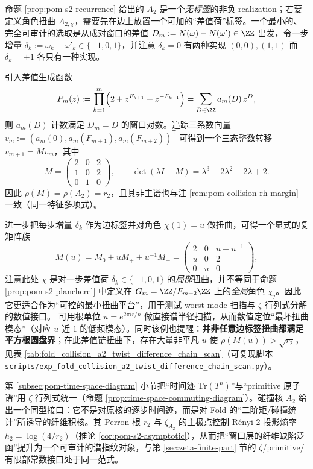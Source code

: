 \begin{remark}\label{rem:pom-a2-diffchain-twist}
命题 \ref{prop:pom-s2-recurrence} 给出的 \(A_2\) 是一个\emph{无标签}的非负 realization；若要定义角色扭曲 \(A_{2,\chi}\)，需要先在边上放置一个可加的“差值荷”标签。一个最小的、完全可审计的选取是从成对窗口的差值
\(
D_m:=N(\omega)-N(\omega')\in\ZZ
\)
出发，令一步增量 \(\delta_k:=\omega_k-\omega'_k\in\{-1,0,1\}\)，并注意 \(\delta_k=0\) 有两种实现 \((0,0),(1,1)\) 而 \(\delta_k=\pm 1\) 各只有一种实现。
\par
引入差值生成函数
\[
P_m(z):=\prod_{k=1}^m\Bigl(2+z^{F_{k+1}}+z^{-F_{k+1}}\Bigr)=\sum_{D\in\ZZ}a_m(D)\,z^D,
\]
则 \(a_m(D)\) 计数满足 \(D_m=D\) 的窗口对数。追踪三系数向量
\(
v_m:=(a_m(0),a_m(F_{m+1}),a_m(F_{m+2}))^{\mathsf T}
\)
可得到一个三态整数转移 \(v_{m+1}=Mv_m\)，其中
\[
M=
\begin{pmatrix}
2&0&2\\
1&0&2\\
0&1&0
\end{pmatrix},
\qquad
\det(\lambda I-M)=\lambda^3-2\lambda^2-2\lambda+2.
\]
因此 \(\rho(M)=\rho(A_2)=r_2\)，且其非主谱也与注 \ref{rem:pom-collision-rh-margin} 一致（同一特征多项式）。
\par
进一步把每步增量 \(\delta_k\) 作为边标签并对角色 \(\chi(1)=u\) 做扭曲，可得一个显式的复矩阵族
\[
M(u)=M_0+uM_++u^{-1}M_-=
\begin{pmatrix}
2&0&u+u^{-1}\\
u&0&2\\
0&u&0
\end{pmatrix},
\]
注意此处 \(\chi\) 是对一步差值荷 \(\delta_k\in\{-1,0,1\}\) 的\emph{局部}扭曲，并不等同于命题 \ref{prop:pom-s2-plancherel} 中定义在 \(G_m=\ZZ/F_{m+2}\ZZ\) 上的\emph{全局}角色 \(\chi_j\)。因此它更适合作为“可控的最小扭曲平台”，用于测试 worst-mode 扫描与 \(\zeta\) 行列式分解的数值接口。
可用根单位 \(u=e^{2\pi i r/n}\) 做直接谱半径扫描，从而数值定位“最坏扭曲模态”（对应 \(u\) 近 \(1\) 的低频模态）。同时该例也提醒：\textbf{并非任意边标签扭曲都满足平方根圆盘界}；在此差值链扭曲下，存在大量非平凡 \(u\) 使 \(\rho(M(u))>\sqrt{r_2}\)，见表 \ref{tab:fold_collision_a2_twist_difference_chain_scan}（可复现脚本 \texttt{scripts/exp\_fold\_collision\_a2\_twist\_difference\_chain\_scan.py}）。
\end{remark}



\begin{remark}\label{rem:pom-collision-diagram}
第 \ref{subsec:pom-time-space-diagram} 小节把“时间迹 \(\mathrm{Tr}(T^n)\)”与“primitive 原子谱”用 \(\zeta\) 行列式统一（命题 \ref{prop:time-space-commuting-diagram}）。碰撞核 \(A_2\) 给出一个同型接口：它不是对原核的逐步时间迹，而是对 Fold 的“二阶矩/碰撞统计”所诱导的纤维积核。其 Perron 根 \(r_2\) 与 \(\zeta_{A_2}\) 的主极点控制 Rényi-2 投影熵率 \(h_2=\log(4/r_2)\)（推论 \ref{cor:pom-s2-asymptotic}），从而把“窗口层的纤维缺陷泛函”提升为一个可审计的谱指纹对象，与第 \ref{sec:zeta-finite-part} 节的 \(\zeta\)/primitive/有限部常数接口处于同一范式。
\end{remark}

